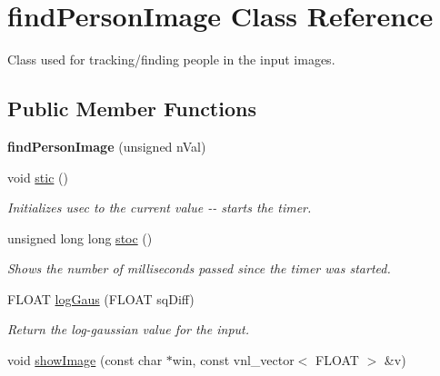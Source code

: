 \hypertarget{classfindPersonImage}{
\section{findPersonImage Class Reference}
\label{classfindPersonImage}
}


Class used for tracking/finding people in the input images.  


\subsection*{Public Member Functions}
\begin{DoxyCompactItemize}
\item 
\hypertarget{classfindPersonImage_a0bc9ead033543b0a2eb5edceff4a9cf4}{
{\bfseries findPersonImage} (unsigned nVal)}
\label{classfindPersonImage_a0bc9ead033543b0a2eb5edceff4a9cf4}

\item 
\hypertarget{classfindPersonImage_adad9d68d77b07e9fe42a0bafd02afa08}{
void \hyperlink{classfindPersonImage_adad9d68d77b07e9fe42a0bafd02afa08}{stic} ()}
\label{classfindPersonImage_adad9d68d77b07e9fe42a0bafd02afa08}

\begin{DoxyCompactList}\small\item\em Initializes {\ttfamily usec} to the current value -\/-\/ starts the timer. \item\end{DoxyCompactList}\item 
\hypertarget{classfindPersonImage_ae8e079ae9b7283ccefaea08319f56ec0}{
unsigned long long \hyperlink{classfindPersonImage_ae8e079ae9b7283ccefaea08319f56ec0}{stoc} ()}
\label{classfindPersonImage_ae8e079ae9b7283ccefaea08319f56ec0}

\begin{DoxyCompactList}\small\item\em Shows the number of milliseconds passed since the timer was started. \item\end{DoxyCompactList}\item 
\hypertarget{classfindPersonImage_aa2c5a86f3ed1ca84dbdc5099c896d5a6}{
FLOAT \hyperlink{classfindPersonImage_aa2c5a86f3ed1ca84dbdc5099c896d5a6}{logGaus} (FLOAT sqDiff)}
\label{classfindPersonImage_aa2c5a86f3ed1ca84dbdc5099c896d5a6}

\begin{DoxyCompactList}\small\item\em Return the log-\/gaussian value for the input. \item\end{DoxyCompactList}\item 
\hypertarget{classfindPersonImage_a85a42b9ecddf18a17d67d9a484570c09}{
void \hyperlink{classfindPersonImage_a85a42b9ecddf18a17d67d9a484570c09}{showImage} (const char $\ast$win, const vnl\_\-vector$<$ FLOAT $>$ \&v)}
\label{classfindPersonImage_a85a42b9ecddf18a17d67d9a484570c09}


\end{DoxyCompactItemize}
